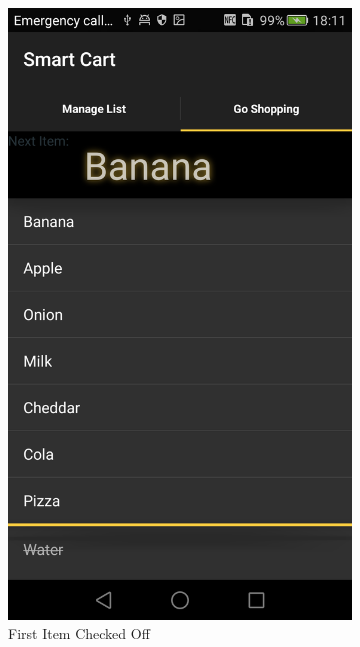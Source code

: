 \begin{figure}[h]
\captionsetup{justification=centering}
\begin{subfigure}{0.475\textwidth} 
\centering 
\includegraphics[height= 0.35\textheight]{res/usermanual/firstItemChecked.png}
\caption{First Item Checked Off}
\label{fig:firstItemChecked}
\end{subfigure} \hspace{0.05\textwidth}
\begin{subfigure}{0.475\textwidth}

\end{subfigure}
\end{figure}
